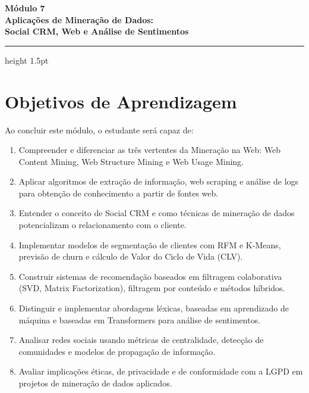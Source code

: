 \documentclass[12pt,a4paper]{article}
\begin{document}
\begin{center}
  {\LARGE\bfseries\color{mineblue} Módulo 7}\\[0.4em]
  {\large\bfseries Aplicações de Mineração de Dados:\\[0.2em]
  Social CRM, Web e Análise de Sentimentos}\\[0.6em]

\end{center}
\vspace{0.5em}
\hrule height 1.5pt
\vspace{1em}

\section{Objetivos de Aprendizagem}

Ao concluir este módulo, o estudante será capaz de:

\begin{enumerate}[label=\faIcon{check-circle}~\textbf{\arabic*.}, leftmargin=2cm, itemsep=0.3em]
  \item Compreender e diferenciar as três vertentes da Mineração na Web: Web Content Mining, Web Structure Mining e Web Usage Mining.
  \item Aplicar algoritmos de extração de informação, web scraping e análise de logs para obtenção de conhecimento a partir de fontes web.
  \item Entender o conceito de Social CRM e como técnicas de mineração de dados potencializam o relacionamento com o cliente.
  \item Implementar modelos de segmentação de clientes com RFM e K-Means, previsão de churn e cálculo de Valor do Ciclo de Vida (CLV).
  \item Construir sistemas de recomendação baseados em filtragem colaborativa (SVD, Matrix Factorization), filtragem por conteúdo e métodos híbridos.
  \item Distinguir e implementar abordagens léxicas, baseadas em aprendizado de máquina e baseadas em Transformers para análise de sentimentos.
  \item Analisar redes sociais usando métricas de centralidade, detecção de comunidades e modelos de propagação de informação.
  \item Avaliar implicações éticas, de privacidade e de conformidade com a LGPD em projetos de mineração de dados aplicados.
\end{enumerate}
\end{document}
